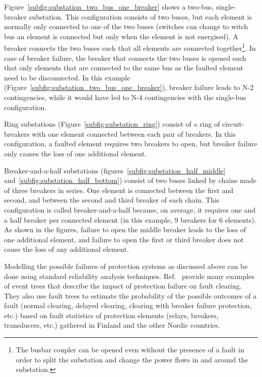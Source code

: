 Figure~\ref{subfig:substation_two_bus_one_breaker} shows a two-bus, single-breaker substation. This configuration consists of two buses, but each element is normally only connected to one of the two buses (switches can change to witch bus an element is connected but only when the element is not energised). A breaker connects the two buses such that all elements are connected together\footnote{The busbar coupler can be opened even without the presence of a fault in order to split the substation and change the power flows in and around the substation.}. In case of breaker failure, the breaker that connects the two buses is opened such that only elements that are connected to the same bus as the faulted element need to be disconnected. In this example (Figure~\ref{subfig:substation_two_bus_one_breaker}), breaker failure leads to N-2 contingencies, while it would have led to N-4 contingencies with the single-bus configuration.

Ring substations (Figure~\ref{subfig:substation_ring}) consist of a ring of circuit-breakers with one element connected between each pair of breakers. In this configuration, a faulted element requires two breakers to open, but breaker failure only causes the loss of one additional element.

Breaker-and-a-half substations (figures~\ref{subfig:substation_half_middle} and~\ref{subfig:substation_half_bottom}) consist of two buses linked by chains made of three breakers in series. One element is connected between the first and second, and between the second and third breaker of each chain. This configuration is called breaker-and-a-half because, on average, it requires one and a half breaker per connected element (in this example, 9 breakers for 6 elements). As shown in the figures, failure to open the middle breaker leads to the loss of one additional element, and failure to open the first or third breaker does not cause the loss of any additional element.

Modelling the possible failures of protection systems as discussed above can be done using standard reliability analysis techniques. Ref.~\cite{GridPSA, Haarla} provide many examples of event trees that describe the impact of protection failure on fault clearing. They also use fault trees to estimate the probability of the possible outcomes of a fault (normal clearing, delayed clearing, clearing with breaker failure protection, etc.) based on fault statistics of protection elements (relays, breakers, transducers, etc.) gathered in Finland and the other Nordic countries.


